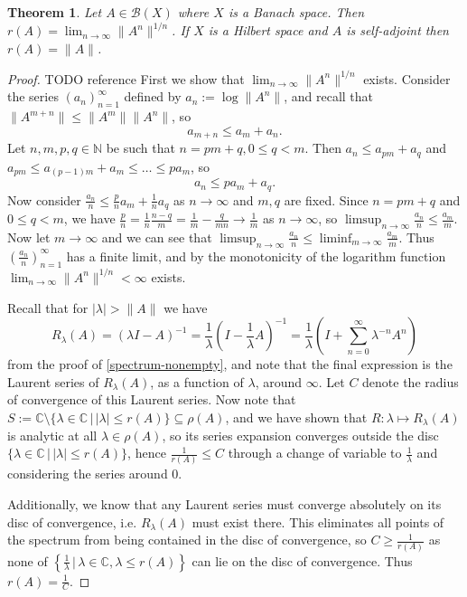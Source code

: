 \documentclass[12pt,oneside]{report}
\newtheorem{thm}{Theorem}[chapter]
\begin{document}
\begin{thm}\label{spectral-radius}
    Let $A \in \mathscr{B}(X)$ where $X$ is a Banach space. Then $r(A) = \lim_{ n \to \infty } \|A^{n}\|^{1/n}$. If $X$ is a Hilbert space and $A$ is self-adjoint then $r(A) = \|A\|$.
\end{thm}
\begin{proof} TODO reference
    First we show that $\lim_{ n \to \infty } \|A^{n}\|^{1/n}$ exists. Consider the series $(a_{n})_{n=1}^{\infty}$ defined by $a_{n} := \log\|A^{n}\|$, and recall that $\|A^{m+n}\| \leq \|A^{m}\|\|A^{n}\|$, so $$a_{m+n} \leq a_{m} + a_{n}.$$ Let $n,m,p,q \in \mathbb{N}$ be such that $n = pm + q, 0 \leq q < m$. Then $a_{n} \leq a_{pm} + a_{q}$ and $a_{pm} \leq a_{(p-1)m} + a_{m} \leq \dots \leq pa_{m}$, so $$a_{n} \leq pa_{m} + a_{q}.$$ Now consider $\frac{a_{n}}{n} \leq \frac{p}{n}a_{m} + \frac{1}{n}a_{q}$ as $n \to \infty$ and $m, q$ are fixed. Since $n = pm + q$ and $0 \leq q < m$, we have $\frac{p}{n} = \frac{1}{n}\frac{n - q}{m} = \frac{1}{m} - \frac{q}{mn} \to \frac{1}{m}$ as $n \to \infty$, so $\limsup_{n \to \infty} \frac{a_{n}}{n} \leq \frac{a_{m}}{m}$. Now let $m \to \infty$ and we can see that $\limsup_{n \to \infty}\frac{a_{n}}{n} \leq \liminf_{m \to \infty}\frac{a_{m}}{m}$. Thus $\left( \frac{a_{n}}{n} \right)_{n=1}^{\infty}$ has a finite limit, and by the monotonicity of the logarithm function $\lim_{ n \to \infty }\|A^{n}\|^{1/n} < \infty$ exists.
    
    Recall that for $|\lambda| > \|A\|$ we have $$R_{\lambda}(A) = (\lambda I - A)^{-1} = \frac{1}{\lambda}\left( I - \frac{1}{\lambda}A \right)^{-1} = \frac{1}{\lambda}\left( I + \sum_{n=0}^{\infty} \lambda^{-n} A^{n} \right)$$ from the proof of \ref{spectrum-nonempty}, and note that the final expression is the Laurent series of $R_{\lambda}(A)$, as a function of $\lambda$, around $\infty$. Let $C$ denote the radius of convergence of this Laurent series. Now note that $S := \mathbb{C} \setminus \{ \lambda \in \mathbb{C} \, | \, |\lambda| \leq r(A) \} \subseteq \rho(A)$, and we have shown that $R: \lambda \mapsto R_\lambda(A)$ is analytic at all $\lambda \in \rho(A)$, so its series expansion converges outside the disc $\{ \lambda \in \mathbb{C} \, | \, |\lambda| \leq r(A) \}$, hence $\frac{1}{r(A)} \leq C$ through a change of variable to $\frac{1}{\lambda}$ and considering the series around $0$.

    Additionally, we know that any Laurent series must converge absolutely on its disc of convergence, i.e. $R_{\lambda}(A)$ must exist there. This eliminates all points of the spectrum from being contained in the disc of convergence, so $C \geq \frac{1}{r(A)}$ as none of $\left\{  \frac{1}{\lambda} \, | \, \lambda \in \mathbb{C}, \lambda \leq r(A) \right\}$ can lie on the disc of convergence. Thus $r(A) = \frac{1}{C}$.
    

\end{proof}
\end{document}

